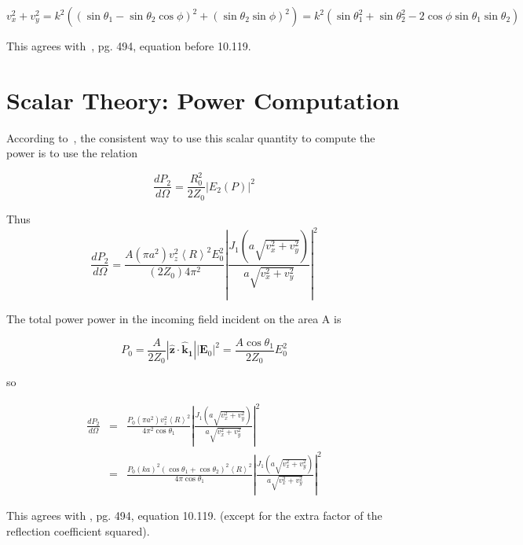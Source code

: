 \documentclass[11pt,openany]{report}
\newcommand{\der}[2]{\frac{d {#1}}{d {#2}}}
\newcommand{\bm}[1]{\mathbf{#1}}
\begin{document}
{{  \begin{equation}
v_{x}^{2}+v_{y}^{2}=k^{2}\left((\sin\theta_{1}-
\sin\theta_{2}\cos{\phi})^2+(\sin\theta_{2}\sin\phi)^{2}\right)=k^{2}
\left(\sin\theta_{1}^{2}+\sin\theta_{2}^{2}-2\cos\phi\sin\theta_{1}\sin\theta_{2}\right)
  \end{equation}

This agrees with~\cite{b:jackson}, pg. 494, equation before 10.119.  

\section{Scalar Theory: Power Computation}

According to~\cite{b:jackson}, the consistent way to use this scalar
quantity to compute the power is to use the relation

  \begin{equation}
\der{P_{2}}{\Omega}=\frac{R_{0}^{2}}{2Z_{0}}|E_{2}(P)|^{2}
  \end{equation}

Thus
  \begin{equation}
\der{P_{2}}{\Omega}=\frac{A(\pi a^{2})v_{z}^{2}\left<R\right>^{2}E_{0}^{2}}{(2Z_{0})4\pi^{2}}\left|\frac{J_{1}(a\sqrt{v_{x}^{2}+v_{y}^{2}})}{a\sqrt{v_{x}^{2}+v_{y}^{2}}}\right|^{2}
  \end{equation}

The total power power in the incoming field incident on the area A is

  \begin{equation}
P_{0}=\frac{A}{2Z_{0}}|\bm{\hat z}\cdot\bm{\hat k_{1}}||\bm E_{0}|^{2}=\frac{A\cos\theta_{1}}{2Z_{0}}E_{0}^{2}
  \end{equation}

so

\begin{eqnarray}
\der{P_{2}}{\Omega}&=&\frac{P_{0}(\pi a^{2})v_{z}^{2}\left<R\right>^{2}}{4\pi^{2}\cos\theta_{1}}\left|\frac{J_{1}(a\sqrt{v_{x}^{2}+v_{y}^{2}})}{a\sqrt{v_{x}^{2}+v_{y}^{2}}}\right|^{2}\\
&=&\frac{P_{0}(ka)^{2}(\cos\theta_{1}+\cos\theta_{2})^{2}\left<R\right>^{2}}{4\pi\cos\theta_{1}}\left|\frac{J_{1}(a\sqrt{v_{x}^{2}+v_{y}^{2}})}{a\sqrt{v_{x}^{2}+v_{y}^{2}}}\right|^{2}
\end{eqnarray}

This agrees with \cite{b:jackson}, pg. 494, equation 10.119.  (except
for the extra factor of the reflection coefficient squared).

}}
\end{document}
